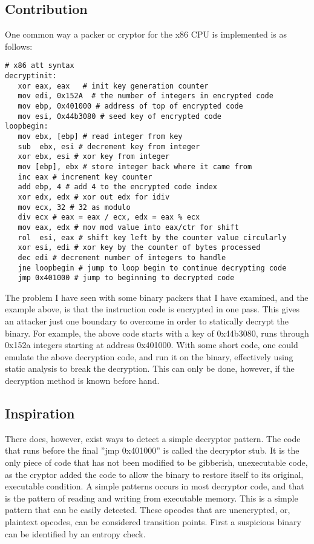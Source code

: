 \documentclass{article}
\begin{document}
\subsection{Contribution}
One common way a packer or cryptor for the x86 CPU is implemented is as follows:
\begin{lstlisting}
# x86 att syntax
decryptinit:
   xor eax, eax   # init key generation counter
   mov edi, 0x152A  # the number of integers in encrypted code
   mov ebp, 0x401000 # address of top of encrypted code
   mov esi, 0x44b3080 # seed key of encrypted code
loopbegin:
   mov ebx, [ebp] # read integer from key
   sub  ebx, esi # decrement key from integer
   xor ebx, esi # xor key from integer
   mov [ebp], ebx # store integer back where it came from
   inc eax # increment key counter
   add ebp, 4 # add 4 to the encrypted code index
   xor edx, edx # xor out edx for idiv
   mov ecx, 32 # 32 as modulo
   div ecx # eax = eax / ecx, edx = eax % ecx
   mov eax, edx # mov mod value into eax/ctr for shift
   rol  esi, eax # shift key left by the counter value circularly
   xor esi, edi # xor key by the counter of bytes processed
   dec edi # decrement number of integers to handle
   jne loopbegin # jump to loop begin to continue decrypting code
   jmp 0x401000 # jump to beginning to decrypted code
\end{lstlisting}
\newline

The problem I have seen with some binary packers that I have examined, and the example above, is that the instruction code is encrypted in one pass. This gives an attacker just one boundary to overcome in order to statically decrypt the binary. For example, the above code starts with a key of 0x44b3080, runs through 0x152a integers starting at address 0x401000. With some short code, one could emulate the above decryption code, and run it on the binary, effectively using static analysis to break the decryption. This can only be done, however, if the decryption method is known before hand. \newline

\subsection{Inspiration}
There does, however, exist ways to detect a simple decryptor pattern.  The code that runs before the final ''jmp 0x401000'' is called the decryptor stub. It is the only piece of code that has not been modified to be gibberish, unexecutable code, as the cryptor added the code to allow the binary to restore itself to its original, executable condition. A simple patterns occurs in most decryptor code, and that is the pattern of reading and writing from executable memory. This is a simple  pattern that can be easily detected. These opcodes that are unencrypted, or, plaintext opcodes, can be considered transition points. First a suspicious binary can be identified by an entropy check. 
\end{document}
